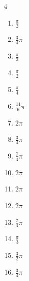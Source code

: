 \begin{multicols}{4}
\begin{enumerate}
  \item $\displaystyle \frac{\pi}{2}$

  \item $\displaystyle \frac{3}{4}\pi$

\columnbreak %

  \item $\displaystyle \frac{\pi}{3}$

  \item $\displaystyle \frac{\pi}{2}$

  \item $\displaystyle \frac{\pi}{4}$

  \item $\displaystyle \frac{11}{6}\pi$

  \item $\displaystyle 2\pi$

  \item $\displaystyle \frac{3}{4}\pi$

  \item $\displaystyle \frac{7}{4}\pi$

  \item $\displaystyle 2\pi$

  \item $\displaystyle 2\pi$

  \item $\displaystyle 2\pi$

  \item $\displaystyle \frac{7}{4}\pi$

  \item $\displaystyle \frac{\pi}{3}$

  \item $\displaystyle \frac{3}{2}\pi$

  \item $\displaystyle \frac{3}{4}\pi$


\end{enumerate}
\end{multicols}
